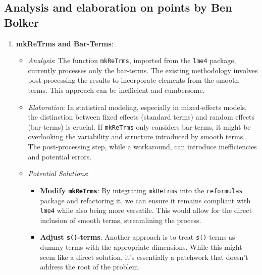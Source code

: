 \subsection{Analysis and elaboration on points by Ben Bolker}

\begin{enumerate}
    \item \textbf{mkReTrms and Bar-Terms}:
    \begin{itemize}
        \item \textit{Analysis}: The function \texttt{mkReTrms}, imported from the \texttt{lme4} package, currently processes only the bar-terms. The existing methodology involves post-processing the results to incorporate elements from the smooth terms. This approach can be inefficient and cumbersome.
        \item \textit{Elaboration}: In statistical modeling, especially in mixed-effects models, the distinction between fixed effects (standard terms) and random effects (bar-terms) is crucial. If \texttt{mkReTrms} only considers bar-terms, it might be overlooking the variability and structure introduced by smooth terms. The post-processing step, while a workaround, can introduce inefficiencies and potential errors.
        \item \textit{Potential Solutions}:
        \begin{itemize}
            \item \textbf{Modify \texttt{mkReTrms}}: By integrating \texttt{mkReTrms} into the \texttt{reformulas} package and refactoring it, we can ensure it remains compliant with \texttt{lme4} while also being more versatile. This would allow for the direct inclusion of smooth terms, streamlining the process.
            \item \textbf{Adjust \texttt{s()}-terms}: Another approach is to treat \texttt{s()}-terms as dummy terms with the appropriate dimensions. While this might seem like a direct solution, it's essentially a patchwork that doesn't address the root of the problem.
        \end{itemize}
    \end{itemize}


\end{enumerate}
